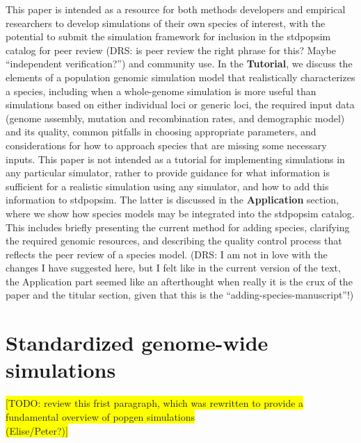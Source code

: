 \documentclass[hidelinks]{article}
\begin{document}
This paper is intended as a resource for both methods
developers and empirical researchers to develop simulations of their own
species of interest, with the potential to submit the simulation
framework for inclusion in the stdpopsim catalog for peer review
(DRS: is peer review the right phrase for this? Maybe ``independent verification?'') and
community use. In the \textbf{Tutorial}, we discuss the elements of a
population genomic simulation model that realistically characterizes a
species, including when a whole-genome simulation is more useful than
simulations based on either individual loci or generic loci, the required input data (genome
assembly, mutation and recombination rates, and demographic model) and
its quality, common pitfalls in choosing appropriate parameters, and
considerations for how to approach species that are missing some
necessary inputs. This paper is not intended as a tutorial for
implementing simulations in any particular simulator, rather to provide
guidance for what information is sufficient for a realistic simulation
using any simulator, and how to add this information to stdpopsim. The latter 
is discussed in the \textbf{Application} section, where we show how
species models may be integrated into the stdpopsim catalog. This includes
briefly presenting the current method for adding species, clarifying the
required genomic resources, and describing the quality control process
that reflects the peer review of a species model.
(DRS: I am not in love with the changes I have suggested here,
but I felt like in the current version of the text, the Application
part seemed like an afterthought when really it is the crux of the paper
and the titular section, given that this is the ``adding-species-manuscript''!)


\hypertarget{sec2}{%
	\section*{Standardized genome-wide simulations}\label{sec:std-sim}}



%

\colorbox{yellow}{[TODO:  review this frist paragraph, which was rewritten to
	provide a fundamental overview of popgen simulations}\\
\colorbox{yellow}{ (Elise/Peter?)]}
	
\end{document}
